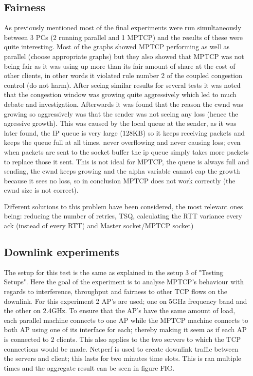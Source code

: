 \documentclass[12pt,a4paper]{article}
\begin{document}
\subsection{Fairness}
As previously mentioned most of the final experiments were run simultaneously
between 3 PCs (2 running parallel and 1 MPTCP) and the results of these were
quite interesting. Most of the graphs showed MPTCP performing as well as
parallel (choose appropriate graphs) but they also showed that MPTCP was not
being fair as it was using up more than its fair amount of share at the cost of
other clients, in other words it violated rule number 2 of the coupled
congestion control (do not harm). After seeing similar results for several tests
it was noted that the congestion window was growing quite aggressively which led
to much debate and investigation. Afterwards it was found that the reason the
cwnd was growing so aggressively was that the sender was not seeing any loss
(hence the agressive growth). This was caused by the local queue at the sender,
as it was later found, the IP queue is very large (128KB) so it keeps receiving
packets and keeps the queue full at all times, never overflowing and never
causing loss; even when packets are sent to the socket buffer the ip queue
simply takes more packets to replace those it sent. This is not ideal for MPTCP,
the queue is always full and sending, the cwnd keeps growing and the alpha
variable cannot cap the growth because it sees no loss, so in conclusion MPTCP
does not work correctly (the cwnd size is not correct).

Different solutions to this problem have been considered, the most relevant ones
being: reducing the number of retries, TSQ, calculating the RTT variance every
ack (instead of every RTT) and Master socket/MPTCP socket)

\subsection{Downlink experiments}
The setup for this test is the same as explained in the setup 3 of "Testing
Setups". Here the goal of the experiment is to analyse MPTCP's behaviour with
regards to interference, throughput and fairness to other TCP flows on the
downlink. For this experiment 2 AP's are used; one on 5GHz frequency band and
the other on 2.4GHz. To ensure that the AP's have the same amount of load, each
parallel machine connects to one AP while the MPTCP machine connects to both AP
using one of its interface for each; thereby making it seem as if each AP is
connected to 2 clients. This also applies to the two servers to which the TCP
connections would be made. Netperf is used to create downlink traffic between
the servers and client; this lasts for two minutes time slots. This is ran
multiple times and the aggregate result can be seen in figure FIG.             %
\end{document}
